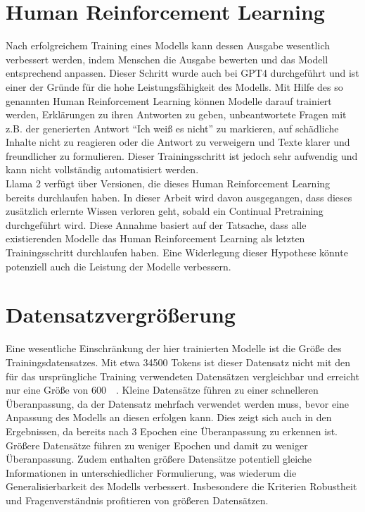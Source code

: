 \section{Human Reinforcement Learning}
Nach erfolgreichem Training eines Modells kann dessen Ausgabe wesentlich verbessert werden, indem Menschen die Ausgabe bewerten und das Modell entsprechend anpassen.
Dieser Schritt wurde auch bei GPT4 durchgeführt und ist einer der Gründe für die hohe Leistungsfähigkeit des Modells.
Mit Hilfe des so genannten Human Reinforcement Learning können Modelle darauf trainiert werden, Erklärungen zu ihren Antworten zu geben, unbeantwortete Fragen mit z.B. der generierten Antwort \enquote{Ich weiß es nicht} zu markieren, auf schädliche Inhalte nicht zu reagieren oder die Antwort zu verweigern und Texte klarer und freundlicher zu formulieren.
Dieser Trainingsschritt ist jedoch sehr aufwendig und kann nicht vollständig automatisiert werden.\\

Llama 2 verfügt über Versionen, die dieses Human Reinforcement Learning bereits durchlaufen haben.
In dieser Arbeit wird davon ausgegangen, dass dieses zusätzlich erlernte Wissen verloren geht, sobald ein Continual Pretraining durchgeführt wird.
Diese Annahme basiert auf der Tatsache, dass alle existierenden Modelle das Human Reinforcement Learning als letzten Trainingsschritt durchlaufen haben.
Eine Widerlegung dieser Hypothese könnte potenziell auch die Leistung der Modelle verbessern.

\section{Datensatzvergrößerung}
Eine wesentliche Einschränkung der hier trainierten Modelle ist die Größe des Trainingsdatensatzes.
Mit etwa \num{34500} Tokens ist dieser Datensatz nicht mit den für das ursprüngliche Training verwendeten Datensätzen vergleichbar und erreicht nur eine Größe von \SI{600}{\kilo\byte}. Kleine Datensätze führen zu einer schnelleren Überanpassung, da der Datensatz mehrfach verwendet werden muss, bevor eine Anpassung des Modells an diesen erfolgen kann.
Dies zeigt sich auch in den Ergebnissen, da bereits nach 3 Epochen eine Überanpassung zu erkennen ist.
Größere Datensätze führen zu weniger Epochen und damit zu weniger Überanpassung.
Zudem enthalten größere Datensätze potentiell gleiche Informationen in unterschiedlicher Formulierung, was wiederum die Generalisierbarkeit des Modells verbessert.
Insbesondere die Kriterien Robustheit und Fragenverständnis profitieren von größeren Datensätzen.\\

